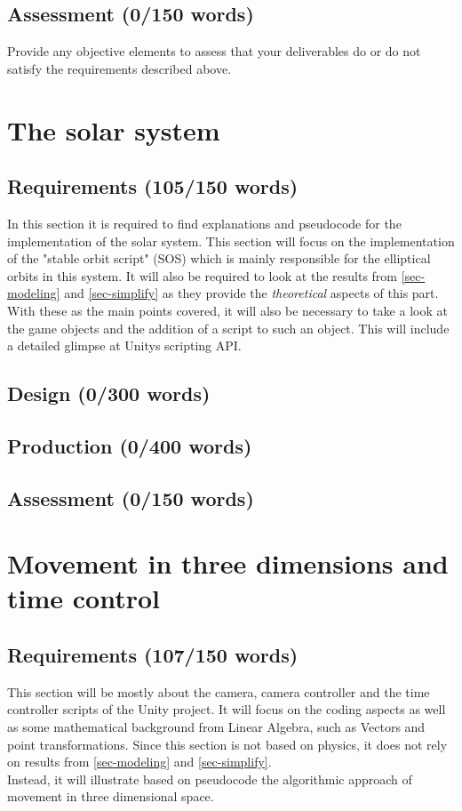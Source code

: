 \documentclass[conference,compsoc]{IEEEtran}
\begin{document}
\subsection{Assessment (0/150 words)}
Provide any objective elements to assess that your deliverables do or do not satisfy the requirements described above. 

\section{The solar system}
\label{sec-solar-system}
\subsection{Requirements (105/150 words)}
In this section it is required to find explanations and pseudocode for the implementation of the solar system. This section will focus on the implementation of the "stable orbit script" (SOS) which is mainly responsible for the elliptical orbits in this system. It will also be required to look at the results from \ref{sec-modeling} and \ref{sec-simplify} as they provide the \emph{theoretical} aspects of this part. With these as the main points covered, it will also be necessary to take a look at the game objects and the addition of a script to such an object. This will include a detailed glimpse at Unitys scripting API. 
\subsection{Design (0/300 words)}
\subsection{Production (0/400 words)}
\subsection{Assessment (0/150 words)}

\section{Movement in three dimensions and time control}
\label{sec-movement-in-3D}
\subsection{Requirements (107/150 words)}
This section will be mostly about the camera, camera controller and the time controller scripts of the Unity project. It will focus on the coding aspects as well as some mathematical background from Linear Algebra, such as Vectors and point transformations. Since this section is not based on physics, it does not rely on results from \ref{sec-modeling} and \ref{sec-simplify}.\\
Instead, it will illustrate based on pseudocode the algorithmic approach of movement in three dimensional space. \\
\end{document}
